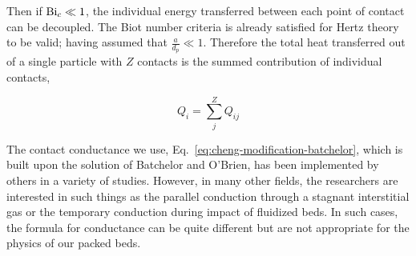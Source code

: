 Then if $\mathrm{Bi}_c \ll 1$, the individual energy transferred between each point of contact can be decoupled. The Biot number criteria is already satisfied for Hertz theory to be valid; having assumed that $\frac{a}{d_p} \ll 1$. Therefore the total heat transferred out of a single particle with $Z$ contacts is the summed contribution of individual contacts, 

\begin{equation}
	Q_i = \sum_j^Z Q_{ij}
\end{equation}

The contact conductance we use, Eq.~\ref{eq:cheng-modification-batchelor}, which is built upon the solution of Batchelor and O'Brien\cite{Batchelor1977}, has been implemented by others in a variety of studies\cite{Vargas2001, Chaudhuri2006, Zhou2009,Cheng19994199}. However, in many other fields, the researchers are interested in such things as the parallel conduction through a stagnant interstitial gas\cite{Bu2013} or the temporary conduction during impact of fluidized beds\cite{Zhu2008,Zhang2011,Wu2011,Li2000}. In such cases, the formula for conductance can be quite different but are not appropriate for the physics of our packed beds.

